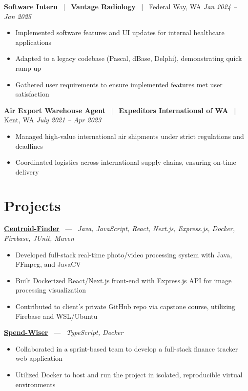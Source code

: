 \documentclass[10pt, letterpaper]{article}
\newcommand{\jobhead}[4]{%
  \vspace{5pt}%
  {\bfseries\color{dark}#1}%
  ~{\color{light}|}~%
  {\bfseries\color{navy}#2}%
  ~{\color{light}|}~%
  {\color{light}#3}%
  \hfill{\color{light}\small\textit{#4}}\\[-2pt]%
}
\newcommand{\projhead}[3]{%
  \vspace{5pt}%
  {\bfseries\color{dark}\href{#2}{#1}}%
  ~{\color{light}---}~%
  {\color{light}\small\textit{#3}}\\[-2pt]%
}
\begin{document}
\jobhead{Software Intern}{Vantage Radiology}{Federal Way, WA}{Jan 2024 – Jan 2025}
\begin{itemize}
  \item Implemented software features and UI updates for internal healthcare applications
  \item Adapted to a legacy codebase (Pascal, dBase, Delphi), demonstrating quick ramp-up
  \item Gathered user requirements to ensure implemented features met user satisfaction
\end{itemize}

\jobhead{Air Export Warehouse Agent}{Expeditors International of WA}{Kent, WA}{July 2021 – Apr 2023}
\begin{itemize}
  \item Managed high-value international air shipments under strict regulations and deadlines
  \item Coordinated logistics across international supply chains, ensuring on-time delivery
\end{itemize}

\section{Projects}

\projhead{Centroid-Finder}{https://github.com/xavierb117/centroid-finder}{Java, JavaScript, React, Next.js, Express.js, Docker, Firebase, JUnit, Maven}
\begin{itemize}
  \item Developed full-stack real-time photo/video processing system with Java, FFmpeg, and JavaCV
  \item Built Dockerized React/Next.js front-end with Express.js API for image processing visualization
  \item Contributed to client’s private GitHub repo via capstone course, utilizing Firebase and WSL/Ubuntu
\end{itemize}

\projhead{Spend-Wiser}{https://github.com/JesseChum/w26-sdev372-spendwiser-finance-tracker}{TypeScript, Docker}
\begin{itemize}
  \item Collaborated in a sprint-based team to develop a full-stack finance tracker web application
  \item Utilized Docker to host and run the project in isolated, reproducible virtual environments
\end{itemize}
\end{document}
